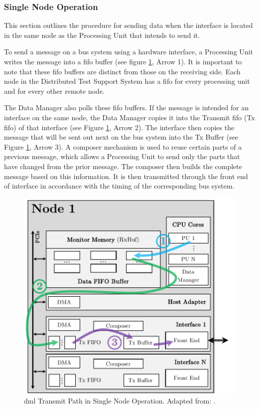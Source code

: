 \subsubsection{Single Node Operation}
This section outlines the procedure for sending data when the interface is located in the same node as the Processing Unit that intends to send it.

To send a message on a bus system using a hardware interface, a Processing Unit writes the message into a \ac{fifo} buffer (see figure \ref{fig:DmlTransSingleNode}, Arrow 1). It is important to note that these \ac{fifo} buffers are distinct from those on the receiving side. Each node in the Distributed Test Support System has a \ac{fifo} for every processing unit and for every other remote node.

The Data Manager also polls these \ac{fifo} buffers. If the message is intended for an interface on the same node, the Data Manager copies it into the Transmit \ac{fifo} (Tx \ac{fifo}) of that interface (see Figure \ref{fig:DmlTransSingleNode}, Arrow 2). The interface then copies the message that will be sent out next on the bus system into the Tx Buffer (see Figure \ref{fig:DmlTransSingleNode}, Arrow 3). A composer mechanism is used to reuse certain parts of a previous message, which allows a Processing Unit to send only the parts that have changed from the prior message. The composer then builds the complete message based on this information. It is then transmitted through the front end of interface in accordance with the timing of the corresponding bus system. \\

\begin{figure}[!htbp]
    \centering
    \includegraphics[width=0.48\linewidth]{figures/dml/dml03a.pdf}
    \caption[DML Transmit Path in Single Node Operation]{\ac{dml} Transmit Path in Single Node Operation. Adapted from: \cite{dml01}.}
    \label{fig:DmlTransSingleNode}
\end{figure}


